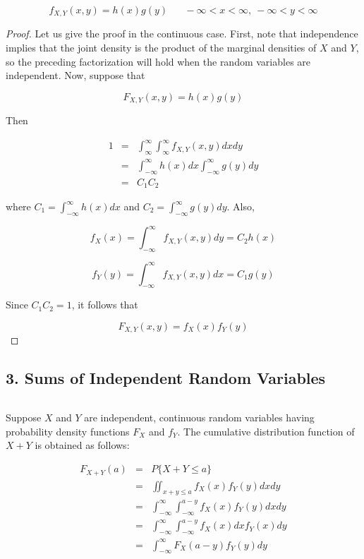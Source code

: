 $$f_{X,Y}(x,y) = h(x)g(y) \hspace{20pt} - \infty < x < \infty,~ - \infty < y < \infty$$


\begin{proof}
	Let us give the proof in the continuous case. First, note that independence implies that the joint density is the product of the marginal densities of $X$ and $Y$, so the preceding factorization will hold when the random variables are independent. Now, suppose that
	
	$$F_{X,Y}(x,y) = h(x)g(y)$$
	
	Then 
	
	\begin{eqnarray*}
		1 &=& \int^{\infty}_{\infty}\int^{\infty}_{\infty}f_{X,Y}(x,y)dxdy\\
		&=& \int^{\infty}_{-\infty}h(x)dx\int^{\infty}_{-\infty}g(y)dy\\
		&=& C_1C_2
	\end{eqnarray*}
	
	where $C_1 = \int^{\infty}_{-\infty}h(x)dx$ and $C_2 = \int^{\infty}_{-\infty}g(y)dy$. Also,
	
	$$f_X(x) = \int^{\infty}_{-\infty}  f_{X,Y}(x,y)dy = C_2h(x)$$
	
	$$f_Y(y) = \int^{\infty}_{-\infty}f_{X,Y}(x,y)dx = C_1g(y)$$
	
	Since $C_1C_2 = 1$, it follows that
	
	$$F_{X,Y}(x,y) = f_X(x)f_Y(y)$$
\end{proof}

\subsection*{3. Sums of Independent Random Variables}$ $

Suppose $X$ and $Y$ are independent, continuous random variables having probability density functions $F_X$ and $f_Y$. The cumulative distribution function of $X + Y$ is obtained as follows:

\begin{eqnarray*}
	F_{X + Y}(a) &=& P\{X + Y \leq a\}\\
	&=& \iint_{x + y \leq a}f_X(x)f_Y(y)dxdy\\
	&=& \int^{\infty}_{-\infty}\int^{a - y}_{-\infty}f_X(x)f_Y(y)dxdy\\
	&=& \int^{\infty}_{-\infty} \int^{a - y}_{-\infty} f_X(x)dxf_Y(x)dy\\
	&=& \int^{\infty}_{-\infty}F_X(a-y)f_Y(y)dy
\end{eqnarray*}

